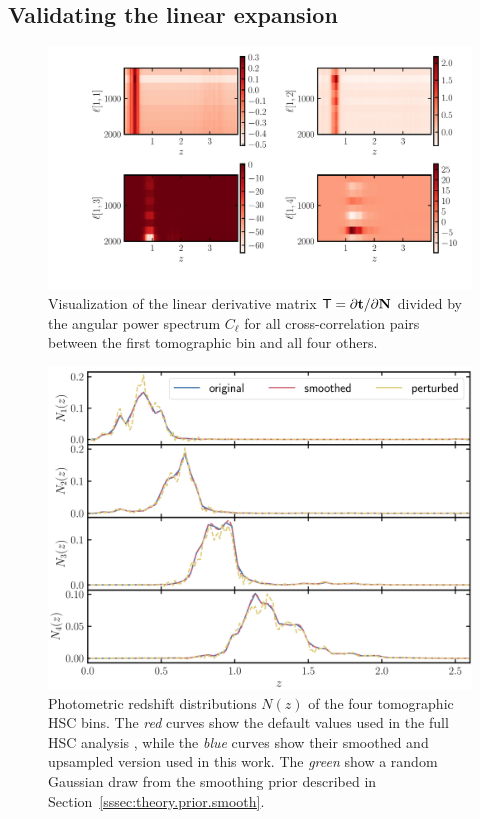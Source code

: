 \documentclass[a4paper,11pt]{article}
\newcommand{\vt}{\mathbf{t}}
\newcommand{\vN}{\mathbf{N}}
\begin{document}
    \subsection{Validating the linear expansion}\label{ssec:hsc.lin}
      \begin{figure}[ht]
        \centering
        \includegraphics[width=1.\textwidth]{./Tmat}
        \caption{Visualization of the linear derivative matrix ${\sf T} = {\partial \vt}/{\partial \vN}$ divided by the angular power spectrum $C_{\ell}$ for all cross-correlation pairs between the first tomographic bin and all four others.} \label{fig:Tmat}
      \end{figure}

      \begin{figure}[ht]
        \centering
        \includegraphics[width=1.\textwidth]{./Nzs}
        \caption{Photometric redshift distributions $N(z)$ of the four tomographic HSC bins. The \textit{red} curves show the default values used in the full HSC analysis \cite{1912.08209}, while the \textit{blue} curves show their smoothed and upsampled version used in this work. The \textit{green} show a random Gaussian draw from the smoothing prior described in Section~\ref{sssec:theory.prior.smooth}.}\label{fig:Nzs}
      \end{figure}
\end{document}
